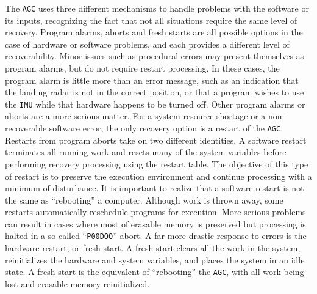 \documentclass[refcap, oxford]{ahsan}
\begin{document}
The \texttt{AGC} uses three different mechanisms to handle problems with the software or its inputs, recognizing the fact that not all situations require the same level of recovery. Program alarms, aborts and fresh starts are all possible options in the case of hardware or software problems, and each provides a different level of recoverability. Minor issues such as procedural errors may present themselves as program alarms, but do not require restart processing. In these cases, the program alarm is little more than an error message, such as an indication that the landing radar is not in the correct position, or that a program wishes to use the \texttt{IMU} while that hardware happens to be turned off. Other program alarms or aborts are a more serious matter. For a system resource shortage or a non-recoverable software error, the only recovery option is a restart of the \texttt{AGC}. Restarts from program aborts take on two different identities. A software restart terminates all running work and resets many of the system variables before performing recovery processing using the restart table. The objective of this type of restart is to preserve the execution environment and continue processing with a minimum of disturbance. It is important to realize that a software restart is not the same as ``rebooting'' a computer. Although work is thrown away, some restarts automatically reschedule programs for execution. More serious problems can result in cases where most of erasable memory is preserved but processing is halted in a so-called ``\texttt{P00DOO}'' abort. A far more drastic response to errors is the hardware restart, or fresh start. A fresh start clears all the work in the system, reinitializes the hardware and system variables, and places the system in an idle state. A fresh start is the equivalent of ``rebooting'' the \texttt{AGC}, with all work being lost and erasable memory reinitialized.

\end{document}

